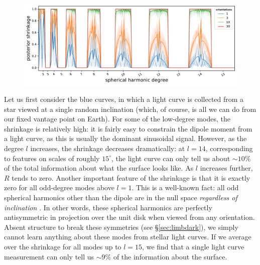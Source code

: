 \documentclass[modern]{aastex62}
\begin{document}
\begin{figure}[ht!]
    \begin{centering}
        \includegraphics[width=\linewidth]{figures/nullspace_ensemble.pdf}
    \end{centering}
\end{figure}

Let us first consider the blue curves, in which a light curve is
collected from a star viewed at a single random inclination (which, of course, is
all we can do from our fixed vantage point on Earth).
For some of the low-degree modes, the shrinkage is relatively high: it is
fairly easy to constrain the dipole moment from a light curve, as this is
usually the dominant sinusoidal signal. However, as the degree $l$
increases, the shrinkage decreases dramatically: at $l = 14$, corresponding
to features on scales of roughly $15^\circ$, the light curve
can only tell us about $\sim 10\%$ of the total information about what the
surface looks like. As $l$ increases further, $R$ tends to zero.
Another important feature of the shrinkage is that it is exactly zero for
all odd-degree modes above $l = 1$. This is a well-known fact: all odd spherical
harmonics other than the dipole are in the null space \emph{regardless of
    inclination} \citep[e.g.,][]{Luger2019}. In other words, these spherical
harmonics are perfectly antisymmetric in projection over the unit disk
when viewed from any orientation. Absent structure to break these symmetries
(see \S\ref{sec:limbdark}), we simply cannot learn anything about these modes from
stellar light curves. If we average over the shrinkage for all modes up to $l=15$,
we find that a single light curve measurement can only tell us $\sim 9\%$
of the information about the surface.
\end{document}
